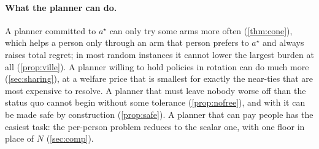 \documentclass[11pt,a4paper]{article}
\theoremstyle{plain}
\theoremstyle{definition}
\theoremstyle{remark}
\newcommand{\astar}{a^\star}
\begin{document}
\paragraph{What the planner can do.} A planner committed to $\astar$ can only try some arms more often (\cref{thm:cone}), which helps a person only through an arm that person prefers to $\astar$ and always raises total regret; in most random instances it cannot lower the largest burden at all (\cref{prop:ville}). A planner willing to hold policies in rotation can do much more (\cref{sec:sharing}), at a welfare price that is smallest for exactly the near-ties that are most expensive to resolve. A planner that must leave nobody worse off than the status quo cannot begin without some tolerance (\cref{prop:nofree}), and with it can be made safe by construction (\cref{prop:safe}). A planner that can pay people has the easiest task: the per-person problem reduces to the scalar one, with one floor in place of $N$ (\cref{sec:comp}).
\end{document}
